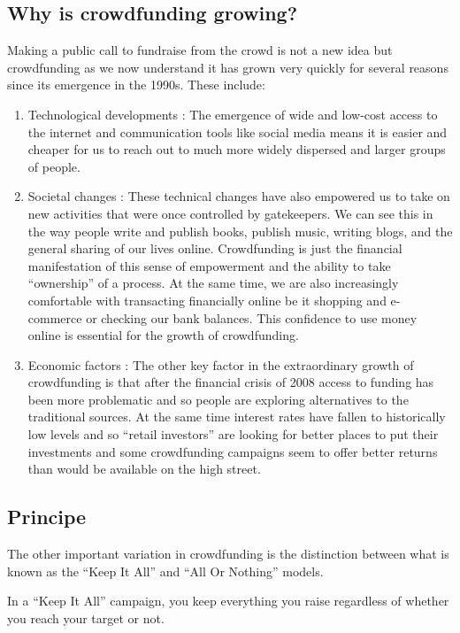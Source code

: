 \subsection*{ Why is crowdfunding growing? }
Making a public call to fundraise from the crowd is not a new idea but crowdfunding as we now understand it has grown very quickly for several reasons since its emergence in the 1990s. These include:
\begin{enumerate}
      \item
            Technological developments : The emergence of wide and low-cost access to the internet and communication tools like social media means it is easier and cheaper for us to reach out to much more widely dispersed and larger groups of people.
      \item
            Societal changes : These technical changes have also empowered us to take on new activities that were once controlled by gatekeepers. We can see this in the way people write and publish books, publish music, writing blogs, and the general sharing of our lives online. Crowdfunding is just the financial manifestation of this sense of empowerment and the ability to take “ownership” of a process. At the same time, we are also increasingly comfortable with transacting financially online be it shopping and e-commerce or checking our bank balances. This confidence to use money online is essential for the growth of crowdfunding.
      \item
            Economic factors : The other key factor in the extraordinary growth of crowdfunding is that after the financial crisis of 2008 access to funding has been more problematic and so people are exploring alternatives to the traditional sources. At the same time interest rates have fallen to historically low levels and so “retail investors” are looking for better places to put their investments and some crowdfunding campaigns seem to offer better returns than would be available on the high street.
\end{enumerate}

\subsection*{Principe }
The other important variation in crowdfunding is the distinction between what is known as the “Keep It All” and “All Or Nothing” models.

In a “Keep It All” campaign, you keep everything you raise regardless of whether you reach your target or not.

